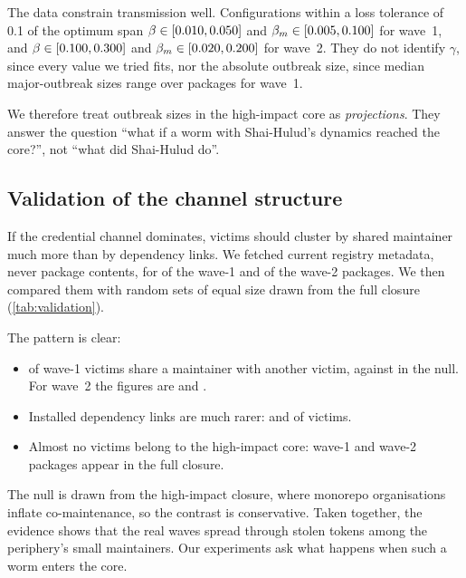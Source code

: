 The data constrain transmission well. Configurations within a loss tolerance of 0.1 of the optimum span
$\beta\in[0.010, 0.050]$ and $\beta_m\in[0.005, 0.100]$ for wave~1, and $\beta\in[0.100, 0.300]$
and $\beta_m\in[0.020, 0.200]$ for wave~2. They do not identify $\gamma$, since every value we tried
fits, nor the absolute outbreak size, since median major-outbreak sizes range over \CalOneSizeRange{}
packages for wave~1.

We therefore treat outbreak sizes in the high-impact core as \emph{projections}. They answer the
question ``what if a worm with Shai-Hulud's dynamics reached the core?'', not ``what did Shai-Hulud
do''.

\subsection{Validation of the channel structure}
If the credential channel dominates, victims should cluster by shared maintainer much more than by
dependency links. We fetched current registry metadata, never package contents, for
\ValOneN{} of the wave-1 and \ValTwoN{} of the wave-2 packages. We then compared them with random sets of
equal size drawn from the full closure (\cref{tab:validation}).

\begin{table}[t]
\centering
\caption{Clustering of real Shai-Hulud victims. A package counts as \emph{co-maintained} if it shares a
maintainer with another victim, and as \emph{dependency-linked} if it has an installed dependency edge to
another victim. The null is the mean over 200 random sets of equal size from the full closure. The last
column counts victims present in the full-closure graph.}
\label{tab:validation}

\end{table}

The pattern is clear:
\begin{itemize}
  \item \ValOneCoMaint{} of wave-1 victims share a maintainer with another victim, against
        \ValOneCoMaintNull{} in the null. For wave~2 the figures are \ValTwoCoMaint{} and
        \ValTwoCoMaintNull.
  \item Installed dependency links are much rarer: \ValOneDepLinked{} and \ValTwoDepLinked{} of victims.
  \item Almost no victims belong to the high-impact core: \ValOneInFull{} wave-1 and \ValTwoInFull{}
        wave-2 packages appear in the full closure.
\end{itemize}

The null is drawn from the high-impact closure, where monorepo organisations inflate co-maintenance, so
the contrast is conservative. Taken together, the evidence shows that the real waves spread through
stolen tokens among the periphery's small maintainers. Our experiments ask what happens when such a worm
enters the core.
